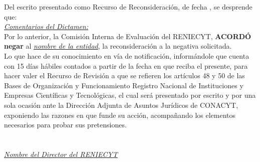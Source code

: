 \noindent Del escrito presentado como Recurso de Reconsideración, de fecha , se desprende que:\\

\underline{{\it Comentarios del Dictamen:}}\\

\noindent Por lo anterior, la Comisión Interna de Evaluación del RENIECYT, {\bf ACORDÓ negar} al \underline{{\it nombre de la entidad}}, la reconsideración a la negativa solicitada.\\

\noindent Lo que hace de su conocimiento en vía de notificación, informándole que cuenta con 15 días hábiles contados a partir de la fecha en que reciba el presente, para hacer valer el Recurso de Revisión a que se refieren los artículos 48 y 50 de las Bases de Organización y Funcionamiento Registro Nacional de Instituciones y Empresas Científicas y Tecnológicas, el cual será presentado por escrito y por una sola ocasión ante la Dirección Adjunta de Asuntos Jurídicos de CONACYT, exponiendo las razones en que funde su acción, acompañando los elementos necesarios para probar sus pretensiones.\\

\\ \\

\noindent \underline{{\it Nombre del Director del RENIECYT}}\\
\\
\\
\\
